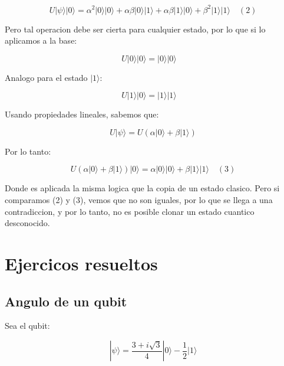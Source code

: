 \documentclass[11pt]{article}
\begin{document}
\begin{equation}
    U |\psi\rangle |0\rangle = \alpha^2 |0\rangle |0\rangle + \alpha \beta |0\rangle |1\rangle + \alpha \beta |1\rangle |0\rangle + \beta^2 |1\rangle |1\rangle \quad (2)
\end{equation}

Pero tal operacion debe ser cierta para cualquier estado, por lo que si lo aplicamos a la base:

\begin{equation}
    U |0\rangle |0\rangle = |0\rangle |0\rangle \quad 
\end{equation}

Analogo para el estado $|1\rangle$:

\begin{equation}
    U |1\rangle |0\rangle = |1\rangle |1\rangle \quad
\end{equation}

Usando propiedades lineales, sabemos que:

\begin{equation}
    U |\psi\rangle = U (\alpha |0\rangle + \beta |1\rangle) 
\end{equation}

Por lo tanto:

\begin{equation}
    U (\alpha |0\rangle + \beta |1\rangle) |0\rangle = \alpha |0\rangle |0\rangle + \beta |1\rangle |1\rangle \quad (3)
\end{equation}

Donde es aplicada la misma logica que la copia de un estado clasico. Pero si comparamos (2) y (3), vemos que no son iguales, por lo que se llega a una contradiccion, y por lo tanto, no es posible clonar un estado cuantico desconocido.

\section{Ejercicos resueltos}

\subsection{Angulo de un qubit}

Sea el qubit:

\begin{equation}
    |\psi\rangle = \frac{3 + i\sqrt{3}}{4} |0\rangle - \frac{1}{2} |1\rangle
\end{equation}
\end{document}
